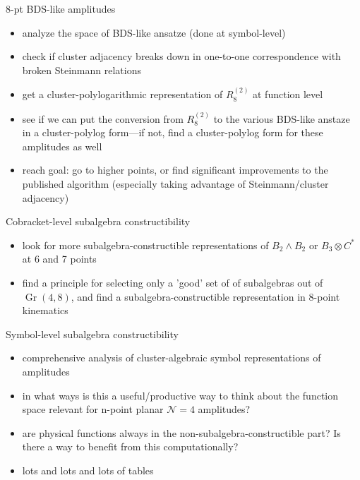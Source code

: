 \documentclass[12pt]{article}
\DeclareMathOperator{\Gr}{Gr}
\begin{document}
\thispagestyle{fancyplain}
\fancyhf{}


8-pt BDS-like amplitudes
\begin{itemize}
	\item analyze the space of BDS-like ansatze (done at symbol-level)
	\item check if cluster adjacency breaks down in one-to-one correspondence with broken Steinmann  relations 
	\item get a cluster-polylogarithmic representation of $R^{(2)}_8$ at function level 
	\item see if we can put the conversion from $R^{(2)}_8$ to the various BDS-like anstaze in a cluster-polylog form---if not, find a cluster-polylog form for these amplitudes as well
	\item reach goal: go to higher points, or find significant improvements to the published algorithm (especially taking advantage of Steinmann/cluster adjacency)\\
\end{itemize}

Cobracket-level subalgebra constructibility
\begin{itemize}
	\item look for more subalgebra-constructible representations of $B_2\wedge B_2$ or $B_3\otimes C^*$ at 6 and 7 points
	\item find a principle for selecting only a 'good' set of of subalgebras out of $\Gr(4,8)$, and find a subalgebra-constructible representation in 8-point kinematics \\
\end{itemize}

Symbol-level subalgebra constructibility
\begin{itemize}
	\item comprehensive analysis of cluster-algebraic symbol representations of amplitudes
	\item in what ways is this a useful/productive way to think about the function space relevant for n-point planar $\mathcal{N}=4$ amplitudes?
	\item are physical functions always in the non-subalgebra-constructible part? Is there a way to benefit from this computationally? 
	\item lots and lots and lots of tables\\
\end{itemize}
\end{document}
